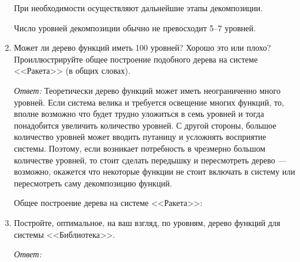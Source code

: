 \documentclass[10pt]{article}
\begin{document}
\begin{enumerate}
  При необходимости осуществляют дальнейшие этапы декомпозиции.

  Число уровней декомпозиции обычно не превосходит 5--7 уровней.

\item{Может ли дерево функций иметь 100 уровней? Хорошо это или плохо? Проиллюстрируйте общее построение подобного дерева на системе <<Ракета>> (в общих словах).}

  \emph{Ответ:} Теоретически дерево функций может иметь неограниченно много уровней. Если система велика и требуется освещение многих функций, то, вполне возможно что будет трудно уложиться в семь уровней и тогда понадобится увеличить количество уровней. С другой стороны, большое количество уровней может вводить путаницу и усложнять восприятие системы. Поэтому, если возникает потребность в чрезмерно большом количестве уровней, то стоит сделать передышку и пересмотреть дерево --- возможно, окажется что некоторые функции не стоит включать в систему или пересмотреть саму декомпозицию функций.

  Общее построение дерева на системе <<Ракета>>:
  

\item{Постройте, оптимальное, на ваш взгляд, по уровням, дерево функций для системы <<Библиотека>>.}

  \emph{Ответ:}
  

\end{enumerate}
\end{document}
